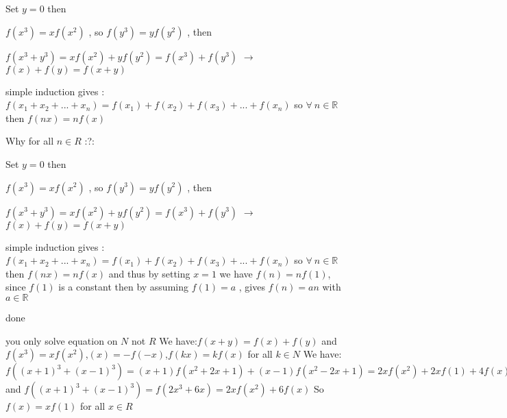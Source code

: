 \begin{solution}
	\begin{tcolorbox}Set $ y = 0$ then

$ f(x^3) = xf(x^2)$ , so $ f(y^3) = yf(y^2)$ , then

$ f(x^3 + y^3) = xf(x^2) + yf(y^2) = f(x^3) + f(y^3)$ $ \rightarrow$ $ f(x) + f(y) = f(x + y)$

simple induction gives : $ f(x_1 + x_2 + ... + x_n) = f(x_1) + f(x_2) + f(x_3) + ... + f(x_n)$  so $ \forall \ n\in\mathbb{R}$ then $ f(nx) = nf(x)$ \end{tcolorbox}
Why for all $ n \in R$  :?: 

\begin{tcolorbox}Set $ y = 0$ then

$ f(x^3) = xf(x^2)$ , so $ f(y^3) = yf(y^2)$ , then

$ f(x^3 + y^3) = xf(x^2) + yf(y^2) = f(x^3) + f(y^3)$ $ \rightarrow$ $ f(x) + f(y) = f(x + y)$

simple induction gives : $ f(x_1 + x_2 + ... + x_n) = f(x_1) + f(x_2) + f(x_3) + ... + f(x_n)$  so $ \forall \ n\in\mathbb{R}$ 
then $ f(nx) = nf(x)$ and thus by setting $ x = 1$ we have $ f(n) = nf(1)$, since $ f(1)$ is a constant then by assuming $ f(1) = a$ , gives $ f(n) = an$ with $ a\in\mathbb{R}$ 

done\end{tcolorbox}
you only solve equation on $ N$ not $ R$
We have:$ f(x + y) = f(x) + f(y)$ and $ f(x^3) = xf(x^2)$,$ (x) = - f( - x)$,$ f(kx) = kf(x)$ for all $ k \in N$
We have:
 $ f((x + 1)^3 + (x - 1)^3) = (x + 1)f(x^2 + 2x + 1) + (x - 1)f(x^2 - 2x + 1) = 2xf(x^2) + 2xf(1) + 4f(x)$
and $ f((x + 1)^3 + (x - 1)^3) = f(2x^3 + 6x) = 2xf(x^2) + 6f(x)$
So $ f(x) = xf(1)$ for all $ x \in R$
\end{solution}



